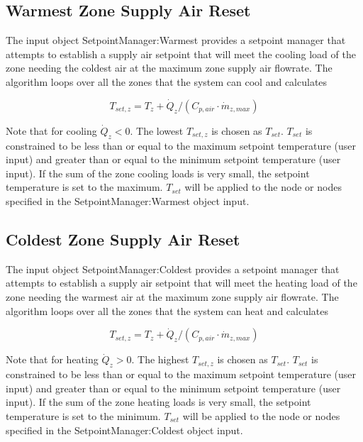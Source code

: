 \subsection{Warmest Zone Supply Air Reset}\label{warmest-zone-supply-air-reset}

The input object SetpointManager:Warmest provides a setpoint manager that attempts to establish a supply air setpoint that will meet the cooling load of the zone needing the coldest air at the maximum zone supply air flowrate. The algorithm loops over all the zones that the system can cool and calculates

\begin{equation}
{T_{set,z}} = {T_z} + {\dot Q_z}/({C_{p,air}}\cdot {\dot m_{z,max}})
\end{equation}

Note that for cooling \({\dot Q_z} < 0\). The lowest \({T_{set,z}}\) is chosen as \({T_{set}}\). \({T_{set}}\) is constrained to be less than or equal to the maximum setpoint temperature (user input) and greater than or equal to the minimum setpoint temperature (user input). If the sum of the zone cooling loads is very small, the setpoint temperature is set to the maximum. \({T_{set}}\) will be applied to the node or nodes specified in the SetpointManager:Warmest object input.

\subsection{Coldest Zone Supply Air Reset}\label{coldest-zone-supply-air-reset}

The input object SetpointManager:Coldest provides a setpoint manager that attempts to establish a supply air setpoint that will meet the heating load of the zone needing the warmest air at the maximum zone supply air flowrate. The algorithm loops over all the zones that the system can heat and calculates

\begin{equation}
{T_{set,z}} = {T_z} + {\dot Q_z}/({C_{p,air}}\cdot {\dot m_{z,max}})
\end{equation}

Note that for heating \({\dot Q_z} > 0\). The highest \({T_{set,z}}\) is chosen as \({T_{set}}\). \({T_{set}}\) is constrained to be less than or equal to the maximum setpoint temperature (user input) and greater than or equal to the minimum setpoint temperature (user input). If the sum of the zone heating loads is very small, the setpoint temperature is set to the minimum. \({T_{set}}\) will be applied to the node or nodes specified in the SetpointManager:Coldest object input.

